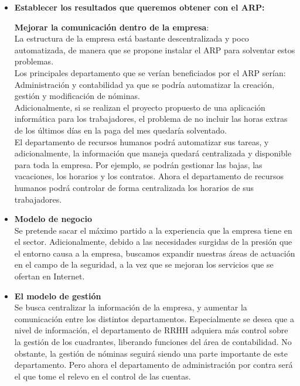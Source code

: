 \documentclass[12pt,letterpaper]{article}
\begin{document}
	
		\begin{itemize}
			\item \textbf{Establecer los resultados que queremos obtener con el ARP:}
		
			\textbf{ Mejorar la comunicación dentro de la empresa}:\\La estructura de la empresa está bastante descentralizada y poco automatizada, de manera que se propone instalar el ARP para solventar estos problemas.\\Los principales departamento que se verían beneficiados por el ARP serían: Administración y contabilidad ya que se podría automatizar la creación, gestión y modificación de nóminas.\\ Adicionalmente, si se realizan el proyecto propuesto de una aplicación informática para los trabajadores, el problema de no incluir las horas extras de los últimos días en la paga del mes quedaría solventado.\\ 
	  El departamento de recursos humanos podrá automatizar sus tareas, y adicionalmente, la información que maneja quedará centralizada y disponible para toda la empresa. Por ejemplo, se podrán gestionar las bajas, las vacaciones, los horarios y los contratos. Ahora el departamento de recursos  humanos podrá controlar de forma centralizada los horarios de sus trabajadores.
	  
	  		\item \textbf{Modelo de negocio}\\
	  Se pretende sacar el máximo partido a la experiencia que la empresa tiene en el sector. Adicionalmente, debido a las necesidades surgidas de la presión que el entorno causa a la empresa, buscamos expandir nuestras áreas de actuación en el campo de la seguridad, a la vez que se mejoran los servicios que se ofertan en Internet.
	  
	  		\item \textbf{El modelo de gestión}\\
	  Se busca centralizar la información de la empresa, y aumentar la comunicación entre los distintos departamentos. Especialmente se desea que a nivel de información, el departamento de RRHH adquiera más control sobre la gestión de los cuadrantes, liberando funciones del área de contabilidad. No obstante, la gestión de nóminas seguirá siendo una parte importante de este departamento.
	  Pero ahora el departamento de administración por contra será el que tome el relevo en el control de las cuentas.
	  

\end{itemize}
\end{document}
